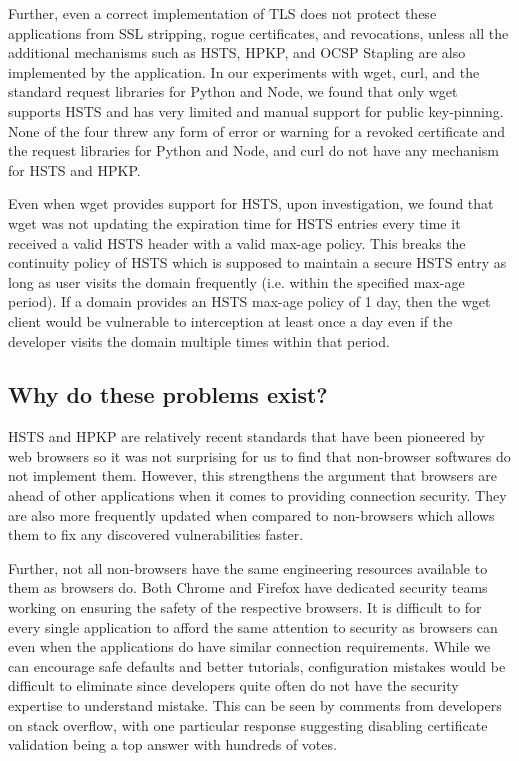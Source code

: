 Further, even a correct implementation of TLS does not protect these
applications from SSL stripping, rogue certificates, and revocations, unless
all the additional mechanisms such as HSTS, HPKP, and OCSP Stapling are also
implemented by the application. In our experiments with wget, curl, and the
standard request libraries for Python and Node, we found that only wget
supports HSTS and has very limited and manual support for public key-pinning.
None of the four threw any form of error or warning for a revoked certificate
and the request libraries for Python and Node, and curl do not have any
mechanism for HSTS and HPKP.

Even when wget provides support for HSTS, upon investigation, we found that
wget was not updating the expiration time for HSTS entries every time it
received a valid HSTS header with a valid max-age policy. This breaks the
continuity policy of HSTS which is supposed to maintain a secure HSTS entry as
long as user visits the domain frequently (i.e. within the specified max-age
period). If a domain provides an HSTS max-age policy of 1 day, then the wget
client would be vulnerable to interception at least once a day even if the
developer visits the domain multiple times within that period.

\subsection{Why do these problems exist?}

HSTS and HPKP are relatively recent standards that have been pioneered by web
browsers so it was not surprising for us to find that non-browser softwares do
not implement them. However, this strengthens the argument that browsers are
ahead of other applications when it comes to providing connection security.
They are also more frequently updated when compared to non-browsers which
allows them to fix any discovered vulnerabilities faster.

Further, not all non-browsers have the same engineering resources available to
them as browsers do. Both Chrome and Firefox have dedicated security teams
working on ensuring the safety of the respective browsers. It is difficult to
for every single application to afford the same attention to security as
browsers can even when the applications do have similar connection
requirements. While we can encourage safe defaults and better tutorials,
configuration mistakes would be difficult to eliminate since developers quite
often do not have the security expertise to understand mistake. This can be
seen by comments from developers on stack overflow, with one particular
response suggesting disabling certificate validation being a top answer with
hundreds of votes.

